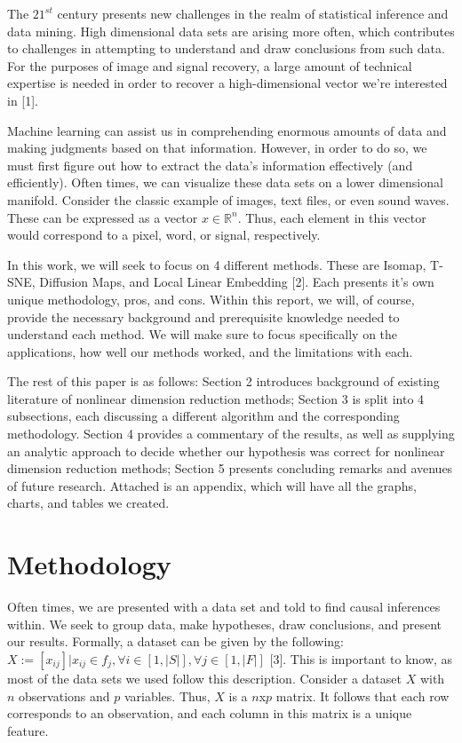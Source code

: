 \documentclass[12pt]{article}
\begin{document}
\hspace{5mm}The $21^{st}$ century presents new challenges in the realm of statistical inference and data mining. High dimensional data sets are arising more often, which contributes to challenges in attempting to understand and draw conclusions from such data. For the purposes of image and signal recovery, a large amount of technical expertise is needed in order to recover a high-dimensional vector we're interested in [1].

Machine learning can assist us in comprehending enormous amounts of data and making judgments based on that information. However, in order to do so, we must first figure out how to extract the data's information effectively (and efficiently). Often times, we can visualize these data sets on a lower dimensional manifold. Consider the classic example of images, text files, or even sound waves. These can be expressed as a vector $x\in\mathbb{R}^n$. Thus, each element in this vector would correspond to a pixel, word, or signal, respectively.

In this work, we will seek to focus on 4 different methods. These are Isomap, T-SNE, Diffusion Maps, and Local Linear Embedding [2]. Each presents it's own unique methodology, pros, and cons. Within this report, we will, of course, provide the necessary background and prerequisite knowledge needed to understand each method. We will make sure to focus specifically on the applications, how well our methods worked, and the limitations with each. 

The rest of this paper is as follows: Section 2 introduces background of existing literature of nonlinear dimension reduction methods; Section 3 is split into 4 subsections, each discussing a different algorithm and the corresponding methodology. Section 4 provides a commentary of the results, as well as supplying an analytic approach to decide whether our hypothesis was correct for nonlinear dimension reduction methods; Section 5 presents concluding remarks and avenues of future research. Attached is an appendix, which will have all the graphs, charts, and tables we created.


\section{Methodology} \label{sec:methodology}

\hspace{5mm}Often times, we are presented with a data set and told to find causal inferences within. We seek to group data, make hypotheses, draw conclusions, and present our results. Formally, a dataset can be given by the following: $X:=[x_{ij}]|x_{ij}\in f_j,\forall i\in[1,|S|],\forall j\in[1,|F|]$ [3]. This is important to know, as most of the data sets we used follow this description. Consider a dataset $X$ with $n$ observations and $p$ variables. Thus, $X$ is a $n$x$p$ matrix. It follows that each row corresponds to an observation, and each column in this matrix is a unique feature. 
\end{document}
